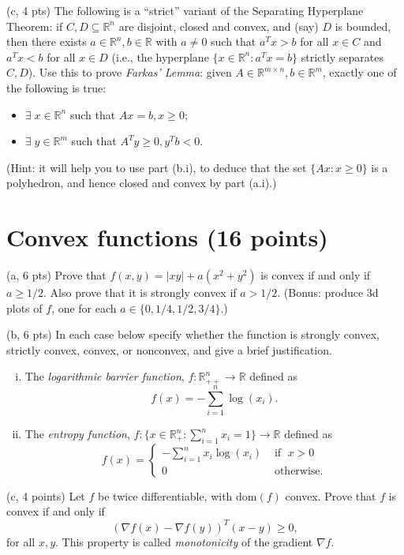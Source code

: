 \documentclass{article}
\theoremstyle{remark}
\theoremstyle{definition}
\def\R{\mathbb{R}}
\begin{document}
\bigskip
\noindent
(c, 4 pts) The following is a ``strict'' variant of the Separating
Hyperplane Theorem: if $C,D \subseteq \R^n$ are disjoint, closed
and convex, and (say) $D$ is bounded, then there exists $a \in
\R^n, b \in \R$ with $a\not=0$ such that $a^T x > b$ for all $x \in C$
and $a^T x < b$ for all $x \in D$ (i.e., the hyperplane $\{x \in
\R^n: a^T x = b\}$ strictly separates $C,D$).  Use this to prove   
{\em Farkas' Lemma}: 
given $A \in \mathbb{R}^{m \times n}, b \in \R^m$, exactly one of 
the following is true:
\begin{itemize}
\item $\exists \; x\in \R^n$ such that $Ax=b, x \geq 0$;
\item $\exists \; y\in \R^m$ such that $A^Ty \geq 0, y^Tb < 0$. 
\end{itemize}
(Hint: it will help you to use part (b.i), to deduce that the set
$\{Ax : x \geq 0\}$ is a polyhedron, and hence closed and convex by
part (a.i).)

\section{Convex functions (16 points)}

\noindent
(a, 6 pts) Prove that $f(x,y) = |xy| + a(x^2+y^2)$ is convex if and
only if $a \geq 1/2$.  Also prove that it is strongly convex if $a >
1/2$. (Bonus: produce 3d plots of $f$, one for each
$a \in \{0,1/4,1/2,3/4\}$.)

\bigskip
\noindent
(b, 6 pts) In each case below specify whether the function is strongly
convex, strictly convex, convex, or nonconvex, and give a brief
justification. 

\begin{enumerate}[i.] 
\item The {\em logarithmic barrier function}, $f:\R^{n}_{++} 
  \rightarrow \R$ defined as 
\[
f(x) = -\sum_{i=1}^n \log(x_i).
\]
\item The {\em entropy function}, $f:\{x\in \R^{n}_{+}:
  \sum_{i=1}^n{x_i} =1\} \rightarrow \R$ defined as 
\[
f(x) = \left\{
\begin{array}{rl}
-\sum_{i=1}^n x_i \log(x_i) & \text{ if } \; x > 0 \\
0 & \text{ otherwise.}
\end{array}
\right.
\]
\end{enumerate} 

\bigskip
\noindent
(c, 4 points) Let $f$ be twice differentiable, with $\mathrm{dom}(f)$ 
convex.  Prove that $f$ is convex if and only if 
$$
(\nabla f(x) - \nabla f(y))^T (x-y) \geq 0,
$$
for all $x,y$.  This property is called {\it monotonicity} of the
gradient $\nabla f$.  
\end{document}
